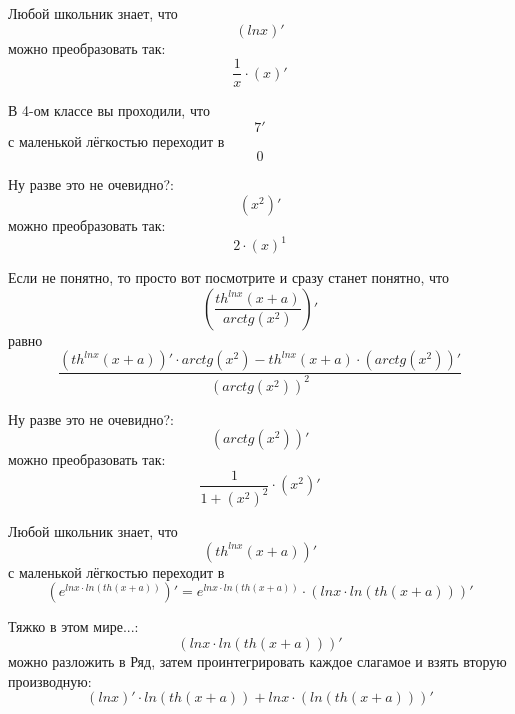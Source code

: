 \documentclass[a4paper, 12pt]{article}
\begin{document}
Любой школьник знает, что
\begin{equation}
\left(lnx \right)'
\end{equation}
можно преобразовать так:
\begin{equation}
\frac{1}{x} \cdot \left(x \right)'
\end{equation}

В 4-ом классе вы проходили, что
\begin{equation}
7 '\end{equation}
с маленькой лёгкостью переходит в
\[0\]

Ну разве это не очевидно?:
\begin{equation}
\left(x^{2} \right)'
\end{equation}
можно преобразовать так:
\begin{equation}
2\cdot \left(x \right)^1
\end{equation}

Если не понятно, то просто вот посмотрите и сразу станет понятно, что
\begin{equation}
\left(\frac{th^{lnx}\left(x + a\right)}{arctg\left(x^{2}\right)} \right)'
\end{equation}
равно
\begin{equation}
\frac{\left(th^{lnx}\left(x + a\right) \right)' \cdot arctg\left(x^{2}\right) - th^{lnx}\left(x + a\right)\cdot \left(arctg\left(x^{2}\right) \right)'}{\left(arctg\left(x^{2}\right) \right)^2}
\end{equation}

Ну разве это не очевидно?:
\begin{equation}
\left(arctg\left(x^{2}\right) \right)'
\end{equation}
можно преобразовать так:
\begin{equation}
\frac{1}{1+\left( x^{2} \right)^2} \cdot \left( x^{2} \right)'
\end{equation}

Любой школьник знает, что
\begin{equation}
\left(th^{lnx}\left(x + a\right) \right)'
\end{equation}
с маленькой лёгкостью переходит в
\begin{equation}
\left(e^{lnx\cdot ln \left(th\left(x + a\right) \right)}  \right)' = e^{lnx\cdot ln \left(th\left(x + a\right) \right)} \cdot \left( lnx\cdot ln \left(th\left(x + a\right) \right) \right)'
\end{equation}

Тяжко в этом мире...:
\begin{equation}
\left(lnx \cdot ln\left(th\left(x + a\right)\right) \right)'
\end{equation}
можно разложить в Ряд, затем проинтегрировать каждое слагамое и взять вторую производную:
\begin{equation}
\left(lnx \right)' \cdot ln\left(th\left(x + a\right)\right) + lnx\cdot \left( ln\left(th\left(x + a\right)\right) \right)'
\end{equation}
\end{document}
